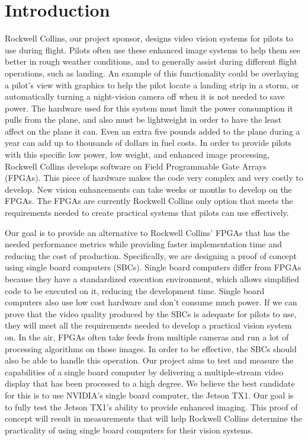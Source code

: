 \documentclass[letterpaper,10pt,titlepage]{IEEEtran}
\begin{document}
   \section{Introduction}
   Rockwell Collins, our project sponsor, designs video vision systems for pilots to use during flight. Pilots often use these enhanced image systems to help them see better in rough weather conditions, and to generally assist during different flight operations, such as landing. An example of this functionality could be overlaying a pilot's view with graphics to help the pilot locate a landing strip in a storm, or automatically turning a night-vision camera off when it is not needed to save power. The hardware used for this system must limit the power consumption it pulls from the plane, and also must be lightweight in order to have the least affect on the plane it can. Even an extra five pounds added to the plane during a year can add up to thousands of dollars in fuel costs. In order to provide pilots with this specific low power, low weight, and enhanced image processing, Rockwell Collins develops software on Field Programmable Gate Arrays (FPGAs). This piece of hardware makes the code very complex and very costly to develop. New vision enhancements can take weeks or months to develop on the FPGAs. The FPGAs are currently Rockwell Collins only option that meets the requirements needed to create practical systems that pilots can use effectively.\\
\par
   Our goal is to provide an alternative to Rockwell Collins' FPGAs that has the needed performance metrics while providing faster implementation time and reducing the cost of production. Specifically, we are designing a proof of concept using single board computers (SBCs). Single board computers differ from FPGAs because they have a standardized execution environment, which allows simplified code to be executed on it, reducing the development time. Single board computers also use low cost hardware and don't consume much power. If we can prove that the video quality produced by the SBCs is adequate for pilots to use, they will meet all the requirements needed to develop a practical vision system on. In the air, FPGAs often take feeds from multiple cameras and run a lot of processing algorithms on those images. In order to be effective, the SBCs should also be able to handle this operation. Our project aims to test and measure the capabilities of a single board computer by delivering a multiple-stream video display that has been processed to a high degree. We believe the best candidate for this is to use NVIDIA's single board computer, the Jetson TX1. Our goal is to fully test the Jetson TX1's ability to provide enhanced imaging. This proof of concept will result in measurements that will help Rockwell Collins determine the practicality of using single board computers for their vision systems.
   
\end{document}
